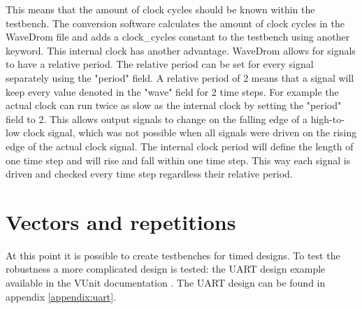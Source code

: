 This means that the amount of clock cycles should be known within the testbench. The conversion software calculates the amount of clock cycles in the WaveDrom file and adds a clock\_cycles constant to the testbench using another keyword.
\npar
This internal clock has another advantage. WaveDrom allows for signals to have a relative period. The relative period can be set for every signal separately using the "period" field. A relative period of 2 means that a signal will keep every value denoted in the "wave" field for 2 time steps. For example the actual clock can run twice as slow as the internal clock by setting the "period" field to 2. This allows output signals to change on the falling edge of a high-to-low clock signal, which was not possible when all signals were driven on the rising edge of the actual clock signal. The internal clock period will define the length of one time step and will rise and fall within one time step. This way each signal is driven and checked every time step regardless their relative period.\newpage
\section{Vectors and repetitions}
At this point it is possible to create testbenches for timed designs. To test the robustness a more complicated design is tested: the UART design example available in the VUnit documentation \cite{vunit_doc}. The UART design can be found in appendix \ref{appendix:uart}.

